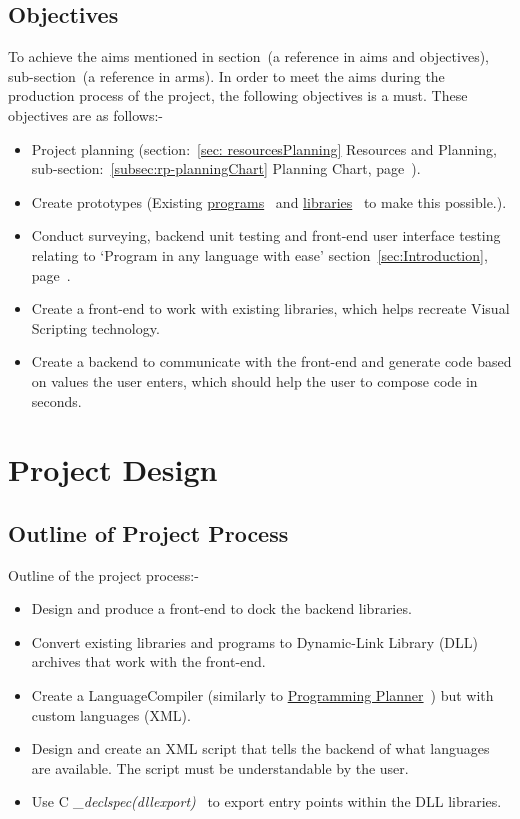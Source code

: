 \documentclass[conference]{IEEEtran}
\begin{document}
      \subsection{Objectives}
        To achieve the aims mentioned in section~(a reference in aims and objectives), sub-section~(a reference in arms). In order to meet the aims during the production process of the project, the following objectives is a must. These objectives are as follows:-
        \begin{itemize}
          \item Project planning (section:~\ref{sec: resourcesPlanning} Resources and Planning, sub-section:~\ref{subsec:rp-planningChart} Planning Chart, page~\pageref{subsec:rp-planningChart}).
          \item Create prototypes (Existing \href{https://github.com/ShinkuKira21/VisualPro-FinalProject/tree/main/Experience}{programs}~\cite{patch_programming_2021} and \href{https://github.com/ShinkuKira21/VisualPro-FinalProject/tree/main/Libraries}{libraries}~\cite{patch_libraries_2021} to make this possible.).
          \item Conduct surveying, backend unit testing and front-end user interface testing relating to `Program in any language with ease' section~\ref{sec:Introduction}, page~\pageref{sec:Introduction}.
          \item Create a front-end to work with existing libraries, which helps recreate Visual Scripting technology.
          \item Create a backend to communicate with the front-end and generate code based on values the user enters, which should help the user to compose code in seconds.
        \end{itemize}
      
    \section{Project Design}
      \subsection{Outline of Project Process}
        Outline of the project process:-
        \begin{itemize}
          \item Design and produce a front-end to dock the backend libraries.
          \item Convert existing libraries and programs to Dynamic-Link Library (DLL) archives that work with the front-end.
          \item Create a LanguageCompiler (similarly to \href{https://github.com/ShinkuKira21/VisualPro-FinalProject/tree/main/Experience}{Programming Planner}~\cite{patch_programming_2021}) but with custom languages (XML).
          \item Design and create an XML script that tells the backend of what languages are available. The script must be understandable by the user.
          \item Use C \textit{\_declspec(dllexport)}~\cite{microsoft_exporting_2019} to export entry points within the DLL libraries.
        \end{itemize}
        
\end{document}
